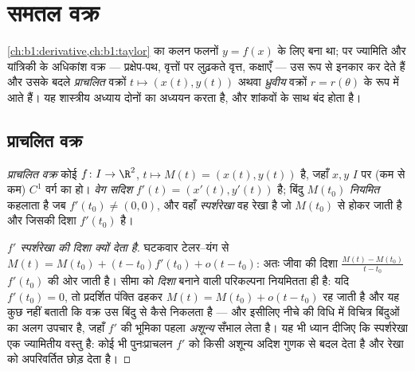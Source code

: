 \chapter{समतल वक्र}\label{ch:b1:curves}

\cref{ch:b1:derivative,ch:b1:taylor} का कलन फलनों $y = f(x)$ के लिए बना था;
पर ज्यामिति और यांत्रिकी के अधिकांश वक्र --- प्रक्षेप-पथ, वृत्तों पर लुढ़कते
वृत्त, कक्षाएँ --- उस रूप से इनकार कर देते हैं और उसके बदले \emph{प्राचलित}
वक्रों $t \mapsto (x(t), y(t))$ अथवा \emph{ध्रुवीय} वक्रों $r = r(\theta)$
के रूप में आते हैं। यह शास्त्रीय अध्याय दोनों का अध्ययन करता है, और शांकवों
के साथ बंद होता है।

\section{प्राचलित वक्र}

\begin{definition}\label{def:b1:curves:def}
\emph{प्राचलित वक्र} कोई  $f \colon I \to
\R^2$, $t \mapsto M(t) = (x(t), y(t))$ है, जहाँ $x, y$  $I$ पर (कम से
कम) $C^1$ वर्ग का हो। \emph{वेग सदिश} $f'(t) = (x'(t), y'(t))$ है; बिंदु
$M(t_0)$ \emph{नियमित} कहलाता है जब $f'(t_0) \neq (0,0)$, और वहाँ
\emph{स्पर्शरेखा} वह रेखा है जो $M(t_0)$ से होकर जाती है और जिसकी दिशा
$f'(t_0)$ है।
\end{definition}

\begin{proof}[$f'$ स्पर्शरेखा की दिशा क्यों देता है]
घटकवार टेलर--यंग से $M(t) = M(t_0) + (t - t_0) f'(t_0) + o(t - t_0)$: अतः
जीवा की दिशा $\frac{M(t) - M(t_0)}{t - t_0}$ $f'(t_0)$ की ओर जाती है। सीमा
को \emph{दिशा} बनाने वाली परिकल्पना नियमितता ही है: यदि $f'(t_0) = 0$, तो
प्रदर्शित पंक्ति ढहकर $M(t) = M(t_0) + o(t - t_0)$ रह जाती है और यह कुछ नहीं
बताती कि वक्र उस बिंदु से कैसे निकलता है --- और इसीलिए नीचे की विधि में
विचित्र बिंदुओं का अलग उपचार है, जहाँ $f'$ की भूमिका पहला \emph{अशून्य}
 सँभाल लेता है। यह भी ध्यान दीजिए कि स्पर्शरेखा एक ज्यामितीय वस्तु है:
कोई भी पुनःप्राचलन $f'$ को किसी अशून्य अदिश गुणक से बदल देता है और रेखा को
अपरिवर्तित छोड़ देता है।
\end{proof}

